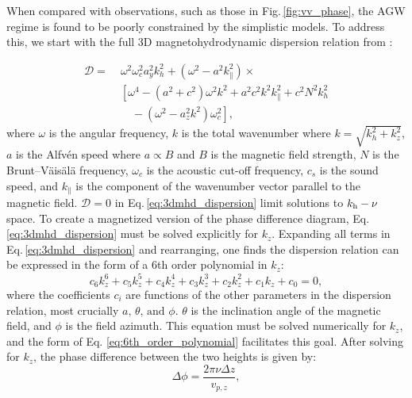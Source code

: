 \documentclass[preprint2,linenumbers]{aastex701}
\begin{document}
When compared with observations, such as those in Fig.\,\ref{fig:vv_phase}, the AGW regime is found to be poorly constrained by the simplistic models. To address this, we start with the full 3D magnetohydrodynamic dispersion relation from \citet{2009_Newington_Cally}:

\begin{equation}
    \begin{split}
        \mathcal{D} =\; & \omega^2 \omega_c^2 a_y^2 k_h^2 
        + \left(\omega^2 - a^2 k_{\parallel}^2\right) \times \\
        & \left[
        \omega^4 
        - (a^2 + c^2)\omega^2 k^2 
        + a^2 c^2 k^2 k_{\parallel}^2 
        + c^2 N^2 k_h^2 \right. \\
        & \left. \quad
        - \left(\omega^2 - a_z^2 k^2\right)\omega_c^2
        \right],
    \end{split}
\label{eq:3dmhd_dispersion}
\end{equation}
where $\omega$ is the angular frequency, $k$ is the total wavenumber where $k=\sqrt{k_h^2 + k_z^2}$, $a$ is the Alfv\'{e}n speed where $a \propto B$ and $B$ is the magnetic field strength, $N$ is the Brunt–Väisälä frequency, $\omega_c$ is the acoustic cut-off frequency, $c_s$ is the sound speed, and $k_{\parallel}$ is the component of the wavenumber vector parallel to the magnetic field. $\mathcal{D} = 0$ in Eq.\,\ref{eq:3dmhd_dispersion} limit solutions to $k_{\rm{h}}-\nu$ space. To create a magnetized version of the phase difference diagram, Eq.\,\ref{eq:3dmhd_dispersion} must be solved explicitly for $k_z$. Expanding all terms in Eq.\,\ref{eq:3dmhd_dispersion} and rearranging, one finds the dispersion relation can be expressed in the form of a 6th order polynomial in $k_z$:
\begin{equation}
    c_6 k_z^6 + c_5 k_z^5 + c_4 k_z^4 + c_3 k_z^3 + c_2 k_z^2 + c_1 k_z + c_0  = 0,
    \label{eq:6th_order_polynomial}
\end{equation}
where the coefficients $c_i$ are functions of the other parameters in the dispersion relation, most crucially $a\text{, }\theta\text{, and } \phi$. $\theta$ is the inclination angle of the magnetic field, and $\phi$ is the field azimuth. This equation must be solved numerically for $k_z$, and the form of Eq. \ref{eq:6th_order_polynomial} facilitates this goal. After solving for $k_z$, the phase difference between the two heights is given by:
\begin{equation}
    \Delta \phi = \frac{2\pi \nu \Delta z}{v_{p, z}},
    \label{fig:phase_difference}
\end{equation}
\end{document}
